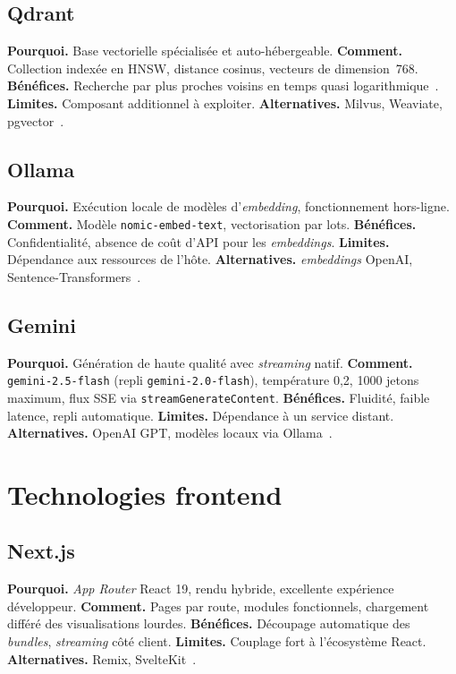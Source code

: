 \subsection{Qdrant}
\textbf{Pourquoi.} Base vectorielle spécialisée et auto-hébergeable.
\textbf{Comment.} Collection indexée en HNSW, distance cosinus, vecteurs de
dimension~768. \textbf{Bénéfices.} Recherche par plus proches voisins en temps
quasi logarithmique~\cite{malkov2018}. \textbf{Limites.} Composant additionnel à
exploiter. \textbf{Alternatives.} Milvus, Weaviate, pgvector~\cite{qdrant}.

\subsection{Ollama}
\textbf{Pourquoi.} Exécution locale de modèles d'\emph{embedding}, fonctionnement
hors-ligne. \textbf{Comment.} Modèle \texttt{nomic-embed-text}, vectorisation par
lots. \textbf{Bénéfices.} Confidentialité, absence de coût d'API pour les
\emph{embeddings}. \textbf{Limites.} Dépendance aux ressources de l'hôte.
\textbf{Alternatives.} \emph{embeddings} OpenAI, Sentence-Transformers~\cite{ollama,reimers2019}.

\subsection{Gemini}
\textbf{Pourquoi.} Génération de haute qualité avec \emph{streaming} natif.
\textbf{Comment.} \texttt{gemini-2.5-flash} (repli \texttt{gemini-2.0-flash}),
température 0,2, 1000 jetons maximum, flux SSE via \texttt{streamGenerateContent}.
\textbf{Bénéfices.} Fluidité, faible latence, repli automatique.
\textbf{Limites.} Dépendance à un service distant. \textbf{Alternatives.}
OpenAI GPT, modèles locaux via Ollama~\cite{gemini}.

\section{Technologies frontend}

\subsection{Next.js}
\textbf{Pourquoi.} \emph{App Router} React 19, rendu hybride, excellente
expérience développeur. \textbf{Comment.} Pages par route, modules fonctionnels,
chargement différé des visualisations lourdes. \textbf{Bénéfices.} Découpage
automatique des \emph{bundles}, \emph{streaming} côté client. \textbf{Limites.}
Couplage fort à l'écosystème React. \textbf{Alternatives.} Remix,
SvelteKit~\cite{nextjs}.

